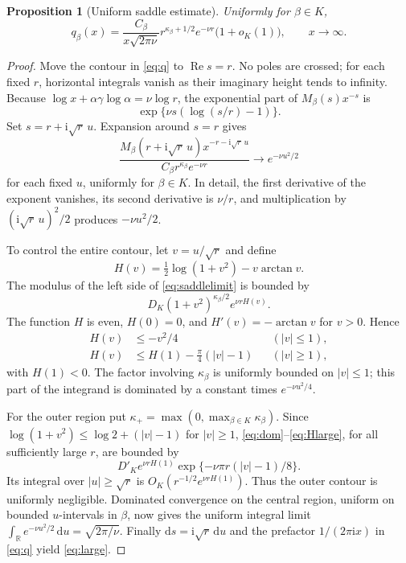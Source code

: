 \documentclass[11pt,a4paper]{article}
\numberwithin{equation}{section}
\newtheorem{proposition}[theorem]{Proposition}
\theoremstyle{definition}\newtheorem{definition}[theorem]{Definition}
\theoremstyle{remark}\newtheorem{remark}[theorem]{Remark}
\newcommand{\R}{\mathbb R}
\newcommand{\ii}{\mathrm i}
\newcommand{\dd}{\,\mathrm d}
\DeclareMathOperator{\Rea}{Re}
\begin{document}
\begin{proposition}[Uniform saddle estimate]\label{prop:large}
Uniformly for \(\beta\in K\),
\begin{equation}\label{eq:large}
 q_\beta(x)=\frac{C_\beta}{x\sqrt{2\pi\nu}}
 r^{\kappa_\beta+1/2}e^{-\nu r}\bigl(1+o_K(1)\bigr),
 \qquad x\to\infty.
\end{equation}
\end{proposition}
\begin{proof}
Move the contour in \eqref{eq:q} to \(\Rea s=r\). No poles
are crossed; for each fixed \(r\), horizontal integrals vanish as
their imaginary height tends to infinity. Because
\(\log x+\alpha\gamma\log\alpha=\nu\log r\), the exponential
part of \(M_\beta(s)x^{-s}\) is
\[
 \exp\{\nu s(\log(s/r)-1)\}.
\]
Set \(s=r+\ii\sqrt r\,u\). Expansion around \(s=r\) gives
\begin{equation}\label{eq:saddlelimit}
 \frac{M_\beta(r+\ii\sqrt r\,u)x^{-r-\ii\sqrt r\,u}}
 {C_\beta r^{\kappa_\beta}e^{-\nu r}}
 \longrightarrow e^{-\nu u^2/2}
\end{equation}
for each fixed \(u\), uniformly for \(\beta\in K\). In detail,
the first derivative of the exponent vanishes, its second derivative
is \(\nu/r\), and multiplication by \((\ii\sqrt r\,u)^2/2\)
produces \(-\nu u^2/2\).

To control the entire contour, let \(v=u/\sqrt r\) and define
\[
 H(v)=\tfrac12\log(1+v^2)-v\arctan v.
\]
The modulus of the left side of \eqref{eq:saddlelimit} is bounded by
\begin{equation}\label{eq:dom}
 D_K(1+v^2)^{\kappa_\beta/2}e^{\nu r H(v)}.
\end{equation}
The function \(H\) is even, \(H(0)=0\), and
\(H'(v)=-\arctan v\) for \(v>0\). Hence
\begin{align}
 H(v)&\le-v^2/4&&(|v|\le1),\label{eq:Hsmall}\\
 H(v)&\le H(1)-\tfrac\pi4(|v|-1)&&(|v|\ge1),\label{eq:Hlarge}
\end{align}
with \(H(1)<0\). The factor involving \(\kappa_\beta\) is
uniformly bounded on \(|v|\le1\); this part of the integrand is
dominated by a constant times \(e^{-\nu u^2/4}\).

For the outer region put
\(\kappa_+=\max(0,\max_{\beta\in K}\kappa_\beta)\).
Since
\(\log(1+v^2)\le\log2+(|v|-1)\) for \(|v|\ge1\),
\eqref{eq:dom}--\eqref{eq:Hlarge}, for all sufficiently large
\(r\), are bounded by
\[
 D'_K e^{\nu rH(1)}
 \exp\{-\nu\pi r(|v|-1)/8\}.
\]
Its integral over \(|u|\ge\sqrt r\) is
\(O_K(r^{-1/2}e^{\nu rH(1)})\). Thus the outer contour is
uniformly negligible. Dominated convergence on the central region,
uniform on bounded \(u\)-intervals in \(\beta\), now gives the
uniform integral limit
\(\int_\R e^{-\nu u^2/2}\dd u=\sqrt{2\pi/\nu}\).
Finally \(\mathrm ds=\ii\sqrt r\,\mathrm du\) and the prefactor
\(1/(2\pi\ii x)\) in \eqref{eq:q} yield
\eqref{eq:large}.
\end{proof}
\end{document}
